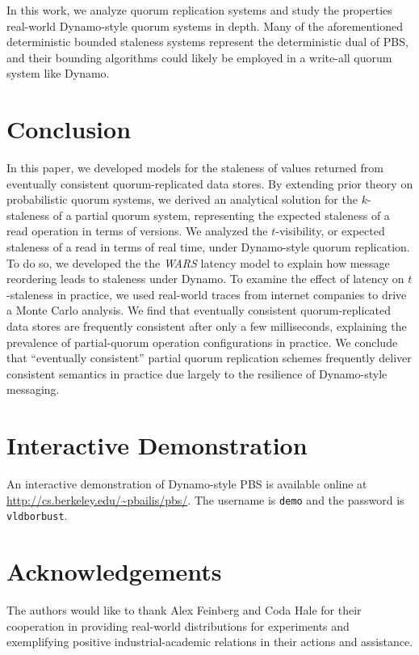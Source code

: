 \documentclass{vldb}
\begin{document}
In this work, we analyze quorum replication systems and study the
properties real-world Dynamo-style quorum systems in depth.  Many of
the aforementioned deterministic bounded staleness systems represent the
deterministic dual of PBS, and their bounding algorithms could likely
be employed in a write-all quorum system like Dynamo.

\section{Conclusion}
\label{sec:conclusion}

In this paper, we developed models for the staleness of values
returned from eventually consistent quorum-replicated data stores.  By
extending prior theory on probabilistic quorum systems, we derived an
analytical solution for the $k$-staleness of a partial quorum system,
representing the expected staleness of a read operation in terms of
versions.  We analyzed the $t$-visibility, or expected staleness of a
read in terms of real time, under Dynamo-style quorum replication.  To
do so, we developed the the \textit{WARS} latency model to explain how
message reordering leads to staleness under Dynamo.  To examine the
effect of latency on $t$-staleness in practice, we used real-world
traces from internet companies to drive a Monte Carlo analysis.  We
find that eventually consistent quorum-replicated data stores are
frequently consistent after only a few milliseconds, explaining the
prevalence of partial-quorum operation configurations in practice.  We
conclude that ``eventually consistent'' partial quorum replication
schemes frequently deliver consistent semantics in practice due largely to the
resilience of Dynamo-style messaging.

\section*{Interactive Demonstration}

An interactive demonstration of Dynamo-style PBS is available online at \url{http://cs.berkeley.edu/~pbailis/pbs/}.  The username is \texttt{demo} and the password is \texttt{vldborbust}.

\section*{Acknowledgements}

The authors would like to thank Alex Feinberg and Coda Hale for their
cooperation in providing real-world distributions for experiments and
exemplifying positive industrial-academic relations in their actions
and assistance.
\end{document}
